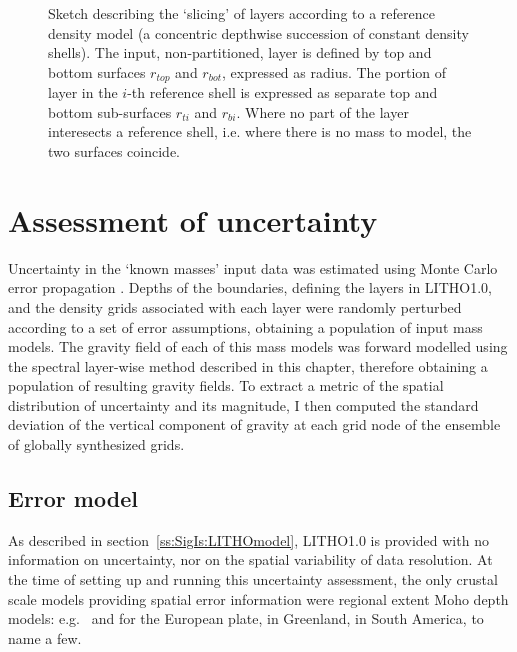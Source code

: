 \begin{figure}
    \begin{adjustbox}{center}
    \end{adjustbox}
    \caption[Sketch describing the `slicing' of layers according to a reference density model.]{
        Sketch describing the `slicing' of layers according to a reference density model (a concentric depthwise succession of constant density shells).
        The input, non-partitioned, layer is defined by top and bottom surfaces $r_{top}$ and $r_{bot}$, expressed as radius.
        The portion of layer in the $i$-th reference shell is expressed as separate top and bottom sub-surfaces $r_{ti}$ and $r_{bi}$.
        Where no part of the layer interesects a reference shell, i.e. where there is no mass to model, the two surfaces coincide.}
    \label{fig:SigIs:RefSlices}
\end{figure}

\FloatBarrier

\section{Assessment of uncertainty}
\label{s:SigIs:Impl}

Uncertainty in the `known masses' input data was estimated using Monte Carlo error propagation \parencite[][chapter 2.6]{Aster2018}.
Depths of the boundaries, defining the layers in {LITHO1.0}, and the density grids associated with each layer were randomly perturbed according to a set of error assumptions, obtaining a population of input mass models.
The gravity field of each of this mass models was forward modelled using the spectral layer-wise method described in this chapter, therefore obtaining a population of resulting gravity fields.
To extract a metric of the spatial distribution of uncertainty and its magnitude, I then computed the standard deviation of the vertical component of gravity at each grid node of the ensemble of globally synthesized grids.

\subsection{Error model}
\label{ss:SigIs:Impl:ErrorModel}

As described in section~\ref{ss:SigIs:LITHOmodel}, {LITHO1.0} is provided with no information on uncertainty, nor on the spatial variability of data resolution.
At the time of setting up and running this uncertainty assessment, the only crustal scale models providing spatial error information were regional extent Moho depth models: e.g.~\textcite{Grad2009} and \textcite{Artemieva2013} for the European plate, \textcite{Steffen2017} in Greenland, \textcite{VanderMeijde2013} in South America, to name a few.

